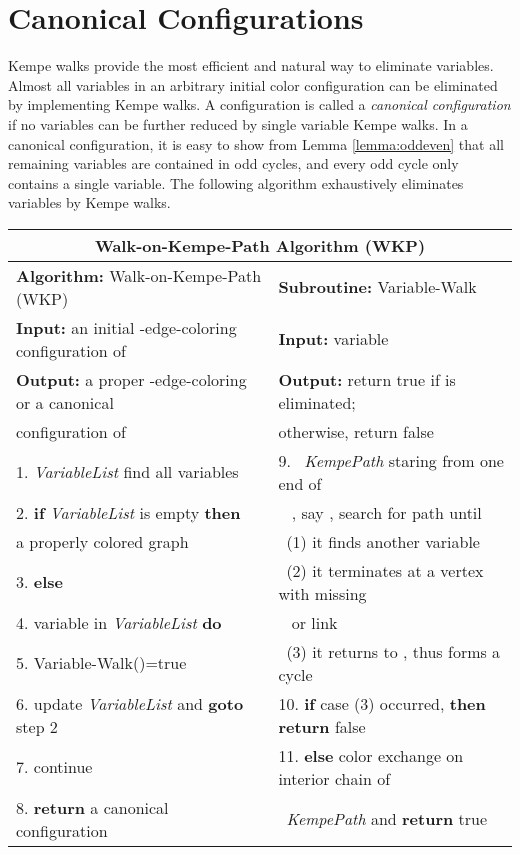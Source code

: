 \documentclass[11pt]{article}
\begin{document}
\section{Canonical Configurations}
Kempe walks provide the most efficient and natural way to eliminate variables. Almost all variables in an arbitrary initial color configuration can be eliminated by implementing Kempe walks. A configuration is called a {\it canonical configuration} if no variables can be further reduced by single variable Kempe walks. In a canonical configuration, it is easy to show from Lemma \ref{lemma:oddeven} that all remaining variables are contained in odd cycles, and every odd cycle only contains a single variable. The following algorithm exhaustively eliminates variables by Kempe walks.

\begin{table}[htbp]
	\centering
	{\footnotesize
			\begin{tabular}{|l|l| } \hline
			\multicolumn{2}{|c|}{Walk-on-Kempe-Path Algorithm (WKP)} \\ \hline
			{\bf Algorithm:} Walk-on-Kempe-Path (WKP)                        &  {\bf Subroutine:} Variable-Walk \\
 			{\bf Input:} an initial -edge-coloring configuration of  &  {\bf Input:} variable  \\
 			{\bf Output:} a proper -edge-coloring or a canonical            &  {\bf Output:} return true if  is eliminated;\\
			 configuration of                            &  otherwise, return false \\            
			1. {\it VariableList}  find all variables            &  9. ~{\it KempePath}  staring from one end  of \\
			2. {\bf if}  {\it VariableList} is empty {\bf then}              &  \quad ~ , say , search for  path until  \\
			\quad {\bf return} a properly colored graph                      &  \quad ~(1) it finds another variable   \\
			3. {\bf else}                                                    &  \quad ~(2) it terminates at a vertex with missing\\ 
			4. \quad {\bf for each} variable  in {\it VariableList} {\bf do}  & \quad ~  or  link\\
			5. \quad \quad {\bf if} Variable-Walk()=true            &  \quad ~(3) it returns to , thus forms a cycle \\
			6. \quad \quad {\bf then} update {\it VariableList} and {\bf goto} step 2 &  10.	{\bf if} case (3) occurred, {\bf then return} false \\
			7. \quad \quad {\bf else} continue 															 &  11. {\bf else} color exchange on interior chain of \\
			8. {\bf return} a canonical configuration                        &	\quad ~{\it KempePath} and {\bf return} true\\	
			\hline		
		\end{tabular}	
		}
	\label{algo:WKPAlgo}
\end{table}
\end{document}
